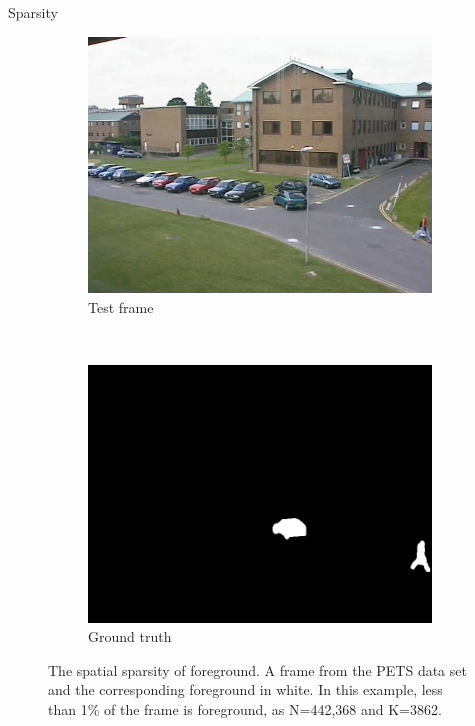 \documentclass[xcolor=dvipsnames,10pt]{beamer}
\begin{document}
  \begin{frame}{Sparsity}    

\begin{figure}
        \centering
        \begin{subfigure}[b]{0.4\textwidth}
                \centering
                \includegraphics[width=\textwidth]{camReal}
                \caption{Test frame}
        \end{subfigure}%
        ~ %
        \begin{subfigure}[b]{0.4\textwidth}
                \centering
                \includegraphics[width=\textwidth]{camGT}
                \caption{Ground truth}
        \end{subfigure}
\caption{The spatial sparsity of foreground. A frame from the PETS data set and the corresponding foreground in white. In this example, less than 1\% of the frame is foreground, as N=442,368 and K=3862.  }\label{fig:sparse}
\end{figure}

 \end{frame}
\end{document}
